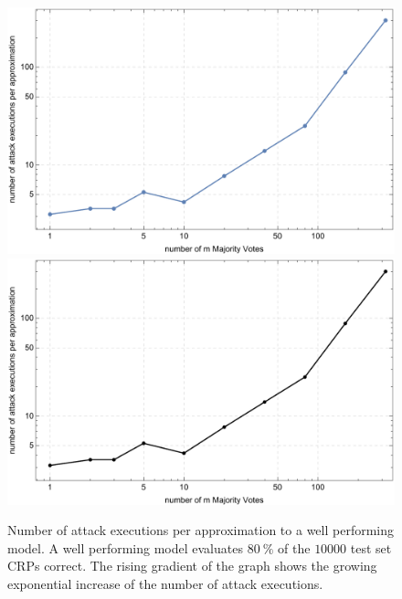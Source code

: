 
\begin{figure}[ht]
\ifx{}\undefined
{}
\else
	\if{}
	\centering
	\includegraphics[width=1.00\textwidth]{images/single-mv-classification-cma-attack-correlation.pdf}
	\else
	\includegraphics[width=1.00\textwidth]{images/single-mv-classification-cma-attack-correlation_mono.pdf}
	\fi
\fi
\caption[Needed \acs{CMA-ES} attack executions for \mpufs]{Number of attack executions per approximation to a well performing model. A well performing model evaluates $80\ \%$ of the $10000$ test set \acp{CRP} correct. The rising gradient of the graph shows the growing exponential increase of the number of attack executions.}
\label{fig:cmasingleattackcorrelation}
\end{figure}


